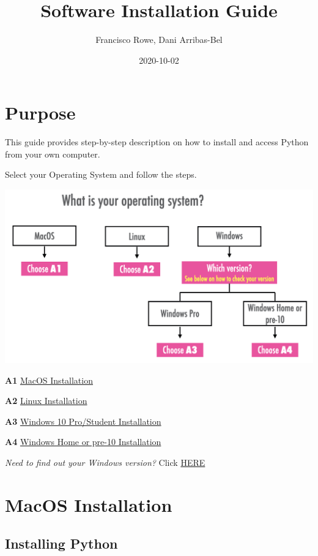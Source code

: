 \documentclass[
]{book}
\title{Software Installation Guide}
\author{Francisco Rowe, Dani Arribas-Bel}
\date{2020-10-02}
\begin{document}
\maketitle

{
\setcounter{tocdepth}{1}
\tableofcontents
}
\hypertarget{purpose}{%
\chapter*{Purpose}\label{purpose}}

This guide provides step-by-step description on how to install and access Python from your own computer.

Select your Operating System and follow the steps.

\begin{center}\includegraphics[width=17.97in]{figs/intro/tree} \end{center}

\textbf{A1} \href{mac.html}{MacOS Installation}

\textbf{A2} \href{linux.html}{Linux Installation}

\textbf{A3} \href{win10pro.html}{Windows 10 Pro/Student Installation}

\textbf{A4} \href{otherwin.html}{Windows Home or pre-10 Installation}

\emph{Need to find out your Windows version?} Click \href{version.html}{HERE}

\hypertarget{macos-installation}{%
\chapter*{MacOS Installation}\label{macos-installation}}

\hypertarget{installing-python}{%
\section*{Installing Python}\label{installing-python}}
\end{document}
